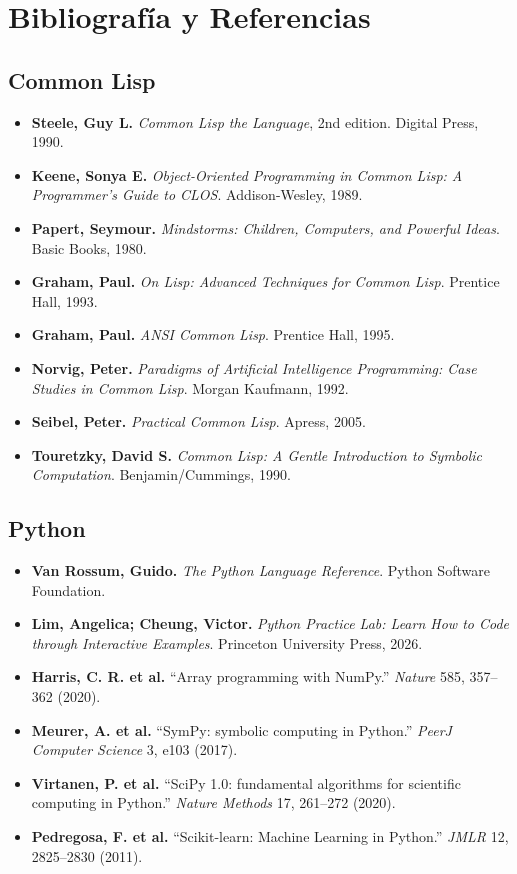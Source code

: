 \chapter{Bibliografía y Referencias}
\label{app:bibliography}

\section*{Common Lisp}

\begin{itemize}
\item \textbf{Steele, Guy L.} \textit{Common Lisp the Language}, 2nd edition.
  Digital Press, 1990.
\item \textbf{Keene, Sonya E.} \textit{Object-Oriented Programming in Common
  Lisp: A Programmer's Guide to CLOS}. Addison-Wesley, 1989.
\item \textbf{Papert, Seymour.} \textit{Mindstorms: Children, Computers, and
  Powerful Ideas}. Basic Books, 1980.
\item \textbf{Graham, Paul.} \textit{On Lisp: Advanced Techniques for Common
  Lisp}. Prentice Hall, 1993.
\item \textbf{Graham, Paul.} \textit{ANSI Common Lisp}. Prentice Hall, 1995.
\item \textbf{Norvig, Peter.} \textit{Paradigms of Artificial Intelligence
  Programming: Case Studies in Common Lisp}. Morgan Kaufmann, 1992.
\item \textbf{Seibel, Peter.} \textit{Practical Common Lisp}. Apress, 2005.
\item \textbf{Touretzky, David S.} \textit{Common Lisp: A Gentle Introduction
  to Symbolic Computation}. Benjamin/Cummings, 1990.
\end{itemize}

\section*{Python}

\begin{itemize}
\item \textbf{Van Rossum, Guido.} \textit{The Python Language Reference}.
  Python Software Foundation.
\item \textbf{Lim, Angelica; Cheung, Victor.} \textit{Python Practice Lab:
  Learn How to Code through Interactive Examples}. Princeton University
  Press, 2026.
\item \textbf{Harris, C. R. et al.} ``Array programming with NumPy.''
  \textit{Nature} 585, 357--362 (2020).
\item \textbf{Meurer, A. et al.} ``SymPy: symbolic computing in Python.''
  \textit{PeerJ Computer Science} 3, e103 (2017).
\item \textbf{Virtanen, P. et al.} ``SciPy 1.0: fundamental algorithms for
  scientific computing in Python.'' \textit{Nature Methods} 17, 261--272
  (2020).
\item \textbf{Pedregosa, F. et al.} ``Scikit-learn: Machine Learning in
  Python.'' \textit{JMLR} 12, 2825--2830 (2011).
\end{itemize}

